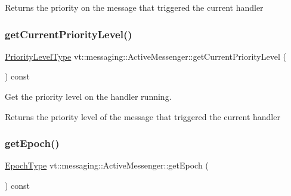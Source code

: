 \begin{DoxyReturn}{Returns}
the priority on the message that triggered the current handler 
\end{DoxyReturn}
\mbox{\label{structvt_1_1messaging_1_1_active_messenger_abfa87fe46bbb97786ba2dcd923da8c39}} 
\subsubsection{\texorpdfstring{get\+Current\+Priority\+Level()}{getCurrentPriorityLevel()}}
{\footnotesize\ttfamily \hyperlink{namespacevt_a53e07fdb3351b0f263e0dfd51b968d5e}{Priority\+Level\+Type} vt\+::messaging\+::\+Active\+Messenger\+::get\+Current\+Priority\+Level (\begin{DoxyParamCaption}{ }\end{DoxyParamCaption}) const}



Get the priority level on the handler running. 

\begin{DoxyReturn}{Returns}
the priority level of the message that triggered the current handler 
\end{DoxyReturn}
\mbox{\label{structvt_1_1messaging_1_1_active_messenger_a627a8b2918ad283edf386038cf5693ca}} 
\subsubsection{\texorpdfstring{get\+Epoch()}{getEpoch()}}
{\footnotesize\ttfamily \hyperlink{namespacevt_a985a5adf291c34a3ca263b3378388236}{Epoch\+Type} vt\+::messaging\+::\+Active\+Messenger\+::get\+Epoch (\begin{DoxyParamCaption}{ }\end{DoxyParamCaption}) const\hspace{0.3cm}{\ttfamily [inline]}}



